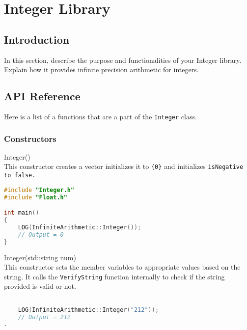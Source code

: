 
\section{Integer Library}

\subsection{Introduction}

In this section, describe the purpose and functionalities of your Integer library. Explain how it provides infinite precision arithmetic for integers. 

\subsection{API Reference}

Here is a list of a functions that are a part of the \verb|Integer| class. 

\subsubsection{Constructors} \vspace*{1em}

{\ttfamily \large Integer()} \\[2mm]
This constructor creates a vector initializes it to \verb|{0}| and initializes \tt{isNegative} to \tt{false}.
\vspace*{1em}
\begin{lstlisting}[language = C]
#include "Integer.h"
#include "Float.h"

int main()
{
	LOG(InfiniteArithmetic::Integer());
	// Output = 0
}
\end{lstlisting}
\vspace*{1em}


\noindent
{\ttfamily \large Integer(std::string num)} \\[2mm]
This constructor sets the member variables to appropriate values based on the string. It calls the \verb|VerifyString| function internally to check if the string provided is valid or not.
\vspace*{1em}
\begin{lstlisting}[language = C]

	LOG(InfiniteArithmetic::Integer("212"));
	// Output = 212
.
\end{lstlisting}
\vspace*{1em}


